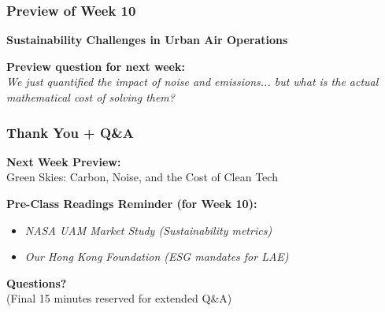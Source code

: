 \documentclass{beamer}
\begin{document}
\begin{frame}[t]
  \frametitle{Preview of Week 10}
  
  \begin{center}
      \Large \textbf{Sustainability Challenges in Urban Air Operations}
  \end{center}
  
  \vspace{1cm}
  \textbf{Preview question for next week:} \\
  \textit{We just quantified the impact of noise and emissions... but what is the actual mathematical cost of solving them?}
\end{frame}

\begin{frame}[t]
  \frametitle{Thank You + Q\&A}
  
  \begin{center}
      \textbf{Next Week Preview:} \\
      \Large Green Skies: Carbon, Noise, and the Cost of Clean Tech
  \end{center}
  
  \vspace{0.5cm}
  \textbf{Pre-Class Readings Reminder (for Week 10):}
  \begin{itemize}
      \item \textit{NASA UAM Market Study (Sustainability metrics)}
      \item \textit{Our Hong Kong Foundation (ESG mandates for LAE)}
  \end{itemize}
  
  \vspace{0.5cm}
  \begin{center}
      \textbf{Questions?} \\
      \small (Final 15 minutes reserved for extended Q\&A)
  \end{center}
\end{frame}
\end{document}
